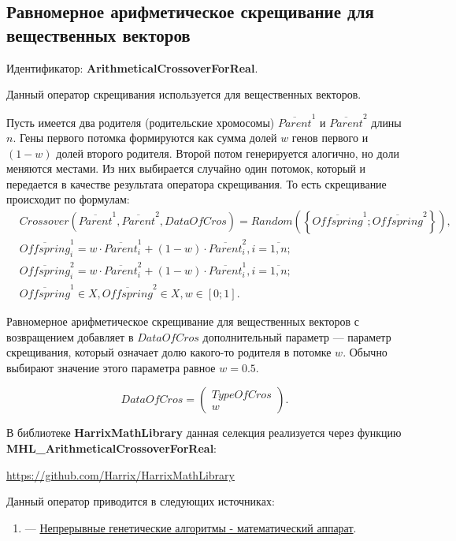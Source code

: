 \subsection{Равномерное арифметическое скрещивание для вещественных векторов}\label{SetOfOperatorsAlgorithms:ArithmeticalCrossoverForReal}

Идентификатор: \textbf{ArithmeticalCrossoverForReal}.

Данный оператор скрещивания используется для вещественных векторов.

Пусть имеется два родителя (родительские хромосомы) $ \overline{Parent}^1 $ и $ \overline{Parent}^2$ длины $n$. Гены первого потомка формируются как сумма долей $w$ генов первого и $ \left( 1-w\right) $ долей второго родителя. Второй потом генерируется алогично, но доли меняются местами.  Из них выбирается случайно один потомок, который и передается в качестве результата оператора скрещивания. То есть скрещивание происходит по формулам:
\begin{align}
\label{SetOfOperatorsAlgorithms:eq:ArithmeticalCrossoverForReal}
&Crossover \left( \overline{Parent}^1, \overline{Parent}^2, DataOfCros\right)=Random \left(\left\lbrace \overline{Offspring}^1; \overline{Offspring}^2\right\rbrace  \right), \\
& \overline{Offspring}^1_i=w\cdot\overline{Parent}^1_i+\left( 1-w\right)\cdot\overline{Parent}^2_i , i=\overline{1,n};\nonumber\\
&\overline{Offspring}^2_i=w\cdot\overline{Parent}^2_i+\left( 1-w\right)\cdot\overline{Parent}^1_i , i=\overline{1,n};\nonumber\\
&\overline{Offspring}^1\in X, \overline{Offspring}^2\in X, w\in \left[ 0; 1\right] .\nonumber
\end{align}

Равномерное арифметическое скрещивание для вещественных векторов с возвращением добавляет в $ DataOfCros $ дополнительный параметр --- параметр скрещивания, который означает долю какого-то родителя в потомке $ w $. Обычно выбирают значение этого параметра равное $ w=0.5 $.

\begin{equation}
DataOfCros=\left( \begin{array}{c} TypeOfCros \\ w \end{array} \right).
\end{equation}

В библиотеке \textbf{HarrixMathLibrary} данная селекция реализуется через функцию \textbf{MHL\_ArithmeticalCrossoverForReal}:

\href{https://github.com/Harrix/HarrixMathLibrary}{https://github.com/Harrix/HarrixMathLibrary}

Данный оператор приводится в следующих источниках:

\begin{enumerate}
\item \cite{web:basegroup.ru:real_coded_ga} ---  \href{http://www.basegroup.ru/library/optimization/real_coded_ga/}{Непрерывные генетические алгоритмы - математический аппарат}.
\end{enumerate}
